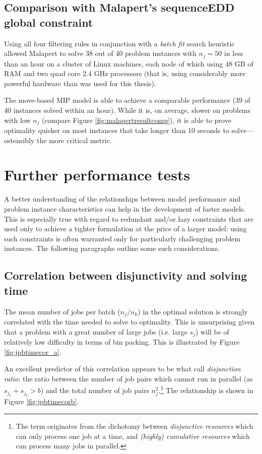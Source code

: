\documentclass[13pt, letterpaper, oneside]{book}
\begin{document}
\subsection{Comparison with Malapert's sequenceEDD global constraint}
Using all four filtering rules in conjunction with a \textit{batch fit} search
heuristic allowed Malapert to solve 38 out of 40 problem instances with $n_j =
50$ in less than an hour on a cluster of Linux machines, each node of which
using 48 GB of RAM and two quad core 2.4 GHz processors (that is, using
considerably more powerful hardware than was used for this thesis). 

The move-based MIP model is able to achieve a comparable performance (39 of 40
instances solved within an hour). While it is, on average, slower on problems
with low $n_j$ (compare Figure \ref{fig:malapertresultcomp}), it is able to
prove optimality quicker on most instances that take longer than 10 seconds to
solve---ostensibly the more critical metric.

\section{Further performance tests}
A better understanding of the relationships between model performance and
problem instance characteristics can help in the development of faster models.
This is especially true with regard to redundant and/or lazy constraints that
are used only to achieve a tighter formulation at the price of a larger model:
using such constraints is often warranted only for particularly challenging
problem instances. The following paragraphs outline some such considerations.

\subsection{Correlation between disjunctivity and solving time}
\label{sec:disjunctivity}
The mean number of jobs per batch ($n_j/n_k$) in the optimal solution is
strongly correlated with the time needed to solve to
optimality. This is unsurprising given that a problem with a great number of large
jobs (i.e. large $s_j$) will be of relatively low
difficulty in terms of bin packing. This is illustrated by Figure
\ref{fig:jpbtimecor_a}.

An excellent predictor of this correlation appears to be what \citet{baptistelepape} call \textit{disjunction ratio}: the ratio between the
number of job pairs which cannot run in parallel (as $s_{j_1} + s_{j_2} > b$) and
the total number of job pairs $n_j^2$.\footnote{The term originates from the
dichotomy between \textit{disjunctive resources} which can only process one job
at a time, and \textit{(highly) cumulative resources} which can process many
jobs in parallel.} The relationship is shown in Figure
\ref{fig:jpbtimecorb}.
\end{document}
